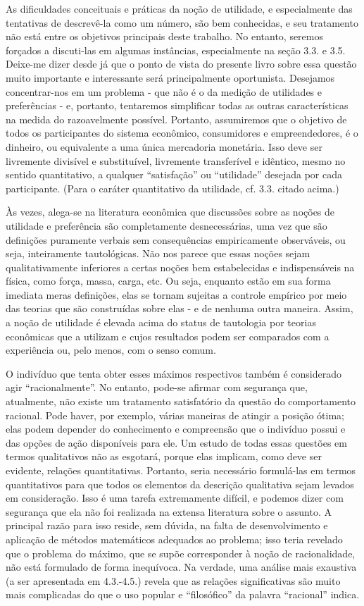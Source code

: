 \documentclass[12pt]{article}
\begin{document}
As dificuldades conceituais e práticas da noção de utilidade, e especialmente das tentativas de descrevê-la como um número, são bem conhecidas, e seu tratamento não está entre os objetivos principais deste trabalho. No entanto, seremos forçados a discuti-las em algumas instâncias, especialmente na seção 3.3. e 3.5. Deixe-me dizer desde já que o ponto de vista do presente livro sobre essa questão muito importante e interessante será principalmente oportunista. Desejamos concentrar-nos em um problema - que não é o da medição de utilidades e preferências - e, portanto, tentaremos simplificar todas as outras características na medida do razoavelmente possível. Portanto, assumiremos que o objetivo de todos os participantes do sistema econômico, consumidores e empreendedores, é o dinheiro, ou equivalente a uma única mercadoria monetária. Isso deve ser livremente divisível e substituível, livremente transferível e idêntico, mesmo no sentido quantitativo, a qualquer “satisfação” ou “utilidade” desejada por cada participante. (Para o caráter quantitativo da utilidade, cf. 3.3. citado acima.)

Às vezes, alega-se na literatura econômica que discussões sobre as noções de utilidade e preferência são completamente desnecessárias, uma vez que são definições puramente verbais sem consequências empiricamente observáveis, ou seja, inteiramente tautológicas. Não nos parece que essas noções sejam qualitativamente inferiores a certas noções bem estabelecidas e indispensáveis na física, como força, massa, carga, etc. Ou seja, enquanto estão em sua forma imediata meras definições, elas se tornam sujeitas a controle empírico por meio das teorias que são construídas sobre elas - e de nenhuma outra maneira. Assim, a noção de utilidade é elevada acima do status de tautologia por teorias econômicas que a utilizam e cujos resultados podem ser comparados com a experiência ou, pelo menos, com o senso comum.

O indivíduo que tenta obter esses máximos respectivos também é considerado agir “racionalmente”. No entanto, pode-se afirmar com segurança que, atualmente, não existe um tratamento satisfatório da questão do comportamento racional. Pode haver, por exemplo, várias maneiras de atingir a posição ótima; elas podem depender do conhecimento e compreensão que o indivíduo possui e das opções de ação disponíveis para ele. Um estudo de todas essas questões em termos qualitativos não as esgotará, porque elas implicam, como deve ser evidente, relações quantitativas. Portanto, seria necessário formulá-las em termos quantitativos para que todos os elementos da descrição qualitativa sejam levados em consideração. Isso é uma tarefa extremamente difícil, e podemos dizer com segurança que ela não foi realizada na extensa literatura sobre o assunto. A principal razão para isso reside, sem dúvida, na falta de desenvolvimento e aplicação de métodos matemáticos adequados ao problema; isso teria revelado que o problema do máximo, que se supõe corresponder à noção de racionalidade, não está formulado de forma inequívoca. Na verdade, uma análise mais exaustiva (a ser apresentada em 4.3.-4.5.) revela que as relações significativas são muito mais complicadas do que o uso popular e “filosófico” da palavra “racional” indica.
\end{document}
